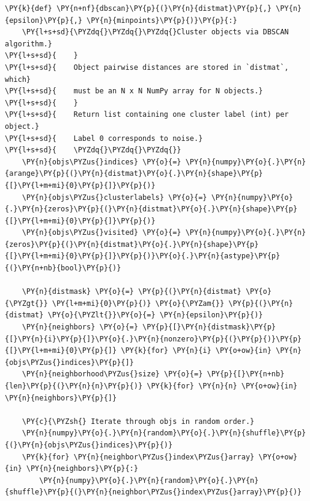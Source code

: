 \begin{listing}
\begin{Verbatim}[fontsize=\tiny,commandchars=\\\{\}]
\PY{k}{def} \PY{n+nf}{dbscan}\PY{p}{(}\PY{n}{distmat}\PY{p}{,} \PY{n}{epsilon}\PY{p}{,} \PY{n}{minpoints}\PY{p}{)}\PY{p}{:}
    \PY{l+s+sd}{\PYZdq{}\PYZdq{}\PYZdq{}Cluster objects via DBSCAN algorithm.}
\PY{l+s+sd}{    }
\PY{l+s+sd}{    Object pairwise distances are stored in `distmat`, which}
\PY{l+s+sd}{    must be an N x N NumPy array for N objects.}
\PY{l+s+sd}{    }
\PY{l+s+sd}{    Return list containing one cluster label (int) per object.}
\PY{l+s+sd}{    Label 0 corresponds to noise.}
\PY{l+s+sd}{    \PYZdq{}\PYZdq{}\PYZdq{}}
    \PY{n}{objs\PYZus{}indices} \PY{o}{=} \PY{n}{numpy}\PY{o}{.}\PY{n}{arange}\PY{p}{(}\PY{n}{distmat}\PY{o}{.}\PY{n}{shape}\PY{p}{[}\PY{l+m+mi}{0}\PY{p}{]}\PY{p}{)}
    \PY{n}{objs\PYZus{}clusterlabels} \PY{o}{=} \PY{n}{numpy}\PY{o}{.}\PY{n}{zeros}\PY{p}{(}\PY{n}{distmat}\PY{o}{.}\PY{n}{shape}\PY{p}{[}\PY{l+m+mi}{0}\PY{p}{]}\PY{p}{)}
    \PY{n}{objs\PYZus{}visited} \PY{o}{=} \PY{n}{numpy}\PY{o}{.}\PY{n}{zeros}\PY{p}{(}\PY{n}{distmat}\PY{o}{.}\PY{n}{shape}\PY{p}{[}\PY{l+m+mi}{0}\PY{p}{]}\PY{p}{)}\PY{o}{.}\PY{n}{astype}\PY{p}{(}\PY{n+nb}{bool}\PY{p}{)}

    \PY{n}{distmask} \PY{o}{=} \PY{p}{(}\PY{n}{distmat} \PY{o}{\PYZgt{}} \PY{l+m+mi}{0}\PY{p}{)} \PY{o}{\PYZam{}} \PY{p}{(}\PY{n}{distmat} \PY{o}{\PYZlt{}}\PY{o}{=} \PY{n}{epsilon}\PY{p}{)}
    \PY{n}{neighbors} \PY{o}{=} \PY{p}{[}\PY{n}{distmask}\PY{p}{[}\PY{n}{i}\PY{p}{]}\PY{o}{.}\PY{n}{nonzero}\PY{p}{(}\PY{p}{)}\PY{p}{[}\PY{l+m+mi}{0}\PY{p}{]} \PY{k}{for} \PY{n}{i} \PY{o+ow}{in} \PY{n}{objs\PYZus{}indices}\PY{p}{]}
    \PY{n}{neighborhood\PYZus{}size} \PY{o}{=} \PY{p}{[}\PY{n+nb}{len}\PY{p}{(}\PY{n}{n}\PY{p}{)} \PY{k}{for} \PY{n}{n} \PY{o+ow}{in} \PY{n}{neighbors}\PY{p}{]}

    \PY{c}{\PYZsh{} Iterate through objs in random order.}
    \PY{n}{numpy}\PY{o}{.}\PY{n}{random}\PY{o}{.}\PY{n}{shuffle}\PY{p}{(}\PY{n}{objs\PYZus{}indices}\PY{p}{)}
    \PY{k}{for} \PY{n}{neighbor\PYZus{}index\PYZus{}array} \PY{o+ow}{in} \PY{n}{neighbors}\PY{p}{:}
        \PY{n}{numpy}\PY{o}{.}\PY{n}{random}\PY{o}{.}\PY{n}{shuffle}\PY{p}{(}\PY{n}{neighbor\PYZus{}index\PYZus{}array}\PY{p}{)}


\end{Verbatim}
\end{listing}
